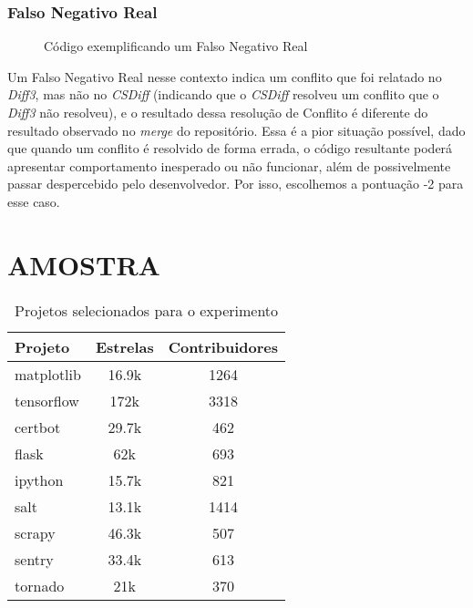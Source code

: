 \subsubsection{Falso Negativo Real}
\begin{figure}[ht]
	\begin{center}
		
		\caption{Código exemplificando um Falso Negativo Real}\label{falso_negativo_real}
	\end{center}
\end{figure}

Um Falso Negativo Real nesse contexto indica um conflito que foi relatado no
\emph{Diff3}, mas não no \emph{CSDiff} (indicando que o \emph{CSDiff} resolveu
um conflito que o \emph{Diff3} não resolveu), e o resultado dessa resolução de
Conflito é diferente do resultado observado no \emph{merge} do repositório.
Essa é a pior situação possível, dado que quando um conflito é resolvido de
forma errada, o código resultante poderá apresentar comportamento inesperado ou
não funcionar, além de possivelmente passar despercebido pelo desenvolvedor.
Por isso, escolhemos a pontuação -2 para esse caso.

\section{AMOSTRA}

\begin{table}[ht]
	\begin{center}
		\begin{tabular}{|l|c|c|}
			\hline
			\textbf{Projeto} & \textbf{Estrelas} & \textbf{Contribuidores} \\
			\hline
			matplotlib       & 16.9k             & 1264                    \\
			tensorflow       & 172k              & 3318                    \\
			certbot          & 29.7k             & 462                     \\
			flask            & 62k               & 693                     \\
			ipython          & 15.7k             & 821                     \\
			salt             & 13.1k             & 1414                    \\
			scrapy           & 46.3k             & 507                     \\
			sentry           & 33.4k             & 613                     \\
			tornado          & 21k               & 370                     \\
			\hline
		\end{tabular}
	\end{center}
	\caption{Projetos selecionados para o experimento}\label{tabela_projeto}
\end{table}


